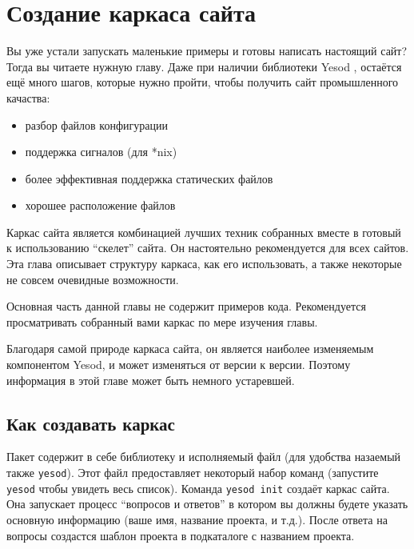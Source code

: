 \chapter{Создание каркаса сайта}

Вы уже устали запускать маленькие примеры и готовы написать настоящий сайт?
Тогда вы читаете нужную главу. Даже при наличии библиотеки Yesod ,
остаётся ещё много шагов, которые нужно пройти, чтобы получить сайт
промышленного качаства:

\begin{itemize}
  \item разбор файлов конфигурации
  \item поддержка сигналов (для *nix)
  \item более эффективная поддержка статических файлов
  \item хорошее расположение файлов 
\end{itemize}

Каркас сайта является комбинацией лучших техник собранных вместе в готовый к 
использованию ``скелет'' сайта. Он настоятельно рекомендуется для всех сайтов.
Эта глава описывает структуру каркаса, как его использовать, а также некоторые 
не совсем очевидные возможности.

Основная часть данной главы не содержит примеров кода. Рекомендуется 
просматривать собранный вами каркас по мере изучения главы.

\begin{remark}
 Благодаря самой природе каркаса сайта, он является наиболее изменяемым компонентом Yesod, и 
 может изменяться от версии к версии. Поэтому информация в этой главе может быть немного устаревшей.
\end{remark}

\section{Как создавать каркас}

Пакет 
содержит в себе библиотеку и исполняемый файл (для удобства 
назаемый также \lstinline!yesod!). Этот файл предоставляет некоторый набор 
команд (запустите \lstinline!yesod! чтобы увидеть весь список). Команда
\lstinline!yesod init! создаёт каркас сайта. Она запускает процесс
``вопросов и ответов'' в котором вы должны будете указать основную информацию
(ваше имя, название проекта, и т.д.). После ответа на вопросы создастся 
шаблон проекта в подкаталоге с названием проекта.

